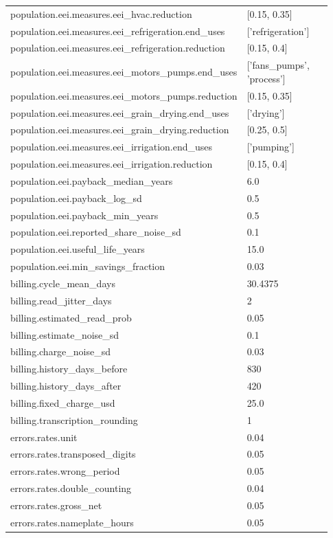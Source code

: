 \begin{longtable}{p{0.55\linewidth}p{0.38\linewidth}}
population.eei.measures.eei\_hvac.reduction & [0.15, 0.35] \\
population.eei.measures.eei\_refrigeration.end\_uses & ['refrigeration'] \\
population.eei.measures.eei\_refrigeration.reduction & [0.15, 0.4] \\
population.eei.measures.eei\_motors\_pumps.end\_uses & ['fans\_pumps', 'process'] \\
population.eei.measures.eei\_motors\_pumps.reduction & [0.15, 0.35] \\
population.eei.measures.eei\_grain\_drying.end\_uses & ['drying'] \\
population.eei.measures.eei\_grain\_drying.reduction & [0.25, 0.5] \\
population.eei.measures.eei\_irrigation.end\_uses & ['pumping'] \\
population.eei.measures.eei\_irrigation.reduction & [0.15, 0.4] \\
population.eei.payback\_median\_years & 6.0 \\
population.eei.payback\_log\_sd & 0.5 \\
population.eei.payback\_min\_years & 0.5 \\
population.eei.reported\_share\_noise\_sd & 0.1 \\
population.eei.useful\_life\_years & 15.0 \\
population.eei.min\_savings\_fraction & 0.03 \\
billing.cycle\_mean\_days & 30.4375 \\
billing.read\_jitter\_days & 2 \\
billing.estimated\_read\_prob & 0.05 \\
billing.estimate\_noise\_sd & 0.1 \\
billing.charge\_noise\_sd & 0.03 \\
billing.history\_days\_before & 830 \\
billing.history\_days\_after & 420 \\
billing.fixed\_charge\_usd & 25.0 \\
billing.transcription\_rounding & 1 \\
errors.rates.unit & 0.04 \\
errors.rates.transposed\_digits & 0.05 \\
errors.rates.wrong\_period & 0.05 \\
errors.rates.double\_counting & 0.04 \\
errors.rates.gross\_net & 0.05 \\
errors.rates.nameplate\_hours & 0.05 \\

\end{longtable}
